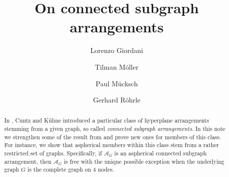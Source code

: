 \documentclass[12pt]{amsart}
\newcommand\CA{{\mathscr A}}
\numberwithin{equation}{section}
\theoremstyle{plain}
\theoremstyle{definition}
\begin{document}
\title[On connected subgraph arrangements]
{On connected subgraph arrangements}

\author[L. Giordani]{Lorenzo Giordani}
\address
{Fakult\"at f\"ur Mathematik,
	Ruhr-Universit\"at Bochum,
	D-44780 Bochum, Germany}

\author[T. M\"oller]{Tilman M\"oller}
\address
{Fakult\"at f\"ur Mathematik,
	Ruhr-Universit\"at Bochum,
	D-44780 Bochum, Germany}

\author[P.~M\"ucksch]{Paul M\"ucksch}
\address
{Institut für Algebra, Zahlentheorie und Diskrete Mathematik, 
	Fakultät für Mathematik und Physik, 
	Leibniz Universität Hannover, 
	Welfengarten 1, D-30167 Hannover, Germany}

\author[G. R\"ohrle]{Gerhard R\"ohrle}
\address
{Fakult\"at f\"ur Mathematik,
Ruhr-Universit\"at Bochum,
D-44780 Bochum, Germany}


\allowdisplaybreaks

\begin{abstract}
In \cite{cuntzkuehne:subgraphs},
Cuntz and K\"uhne
introduced a particular class of hyperplane arrangements stemming from a given graph, so called
\emph{connected subgraph arrangements}.
In this note we strengthen some of the result from  \cite{cuntzkuehne:subgraphs}
and prove new ones for members of this class.
For instance, we show that aspherical members within this class stem from a rather restricted 
set of graphs. Specifically, if $\CA_G$ is an aspherical connected subgraph arrangement, then $\CA_G$ is free with the unique possible exception when the underlying graph $G$ is the complete graph on $4$ nodes.
\end{abstract}

\maketitle

\setcounter{tocdepth}{1}

\tableofcontents
\end{document}

